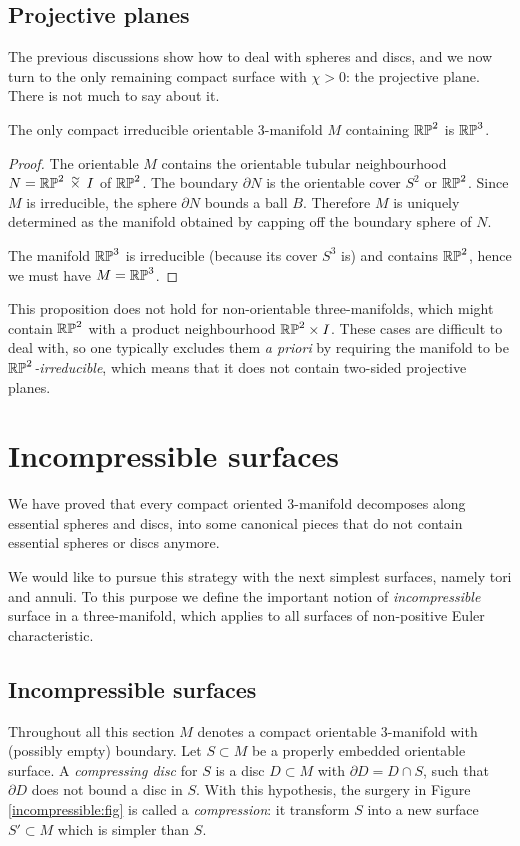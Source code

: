 \subsection{Projective planes}
The previous discussions show how to deal with spheres and discs, and we now turn to the only remaining compact surface with $\chi>0$: the projective plane. There is not much to say about it.

\begin{prop}
The only compact irreducible orientable 3-manifold $M$ containing $\mathbb{RP}^2$ is $\mathbb{RP}^3$.
\end{prop}
\begin{proof}
The orientable $M$ contains the orientable tubular neighbourhood $N=\matRP^2 \timtil I$ of $\mathbb{RP}^2$. The boundary $\partial N$ is the orientable cover $S^2$ or $\mathbb{RP}^2$. Since $M$ is irreducible, the sphere $\partial N$ bounds a ball $B$. Therefore $M$ is uniquely determined as the manifold obtained by capping off the boundary sphere of $N$. 

The manifold $\mathbb{RP}^3$ is irreducible (because its cover $S^3$ is) and contains $\mathbb{RP}^2$, hence we must have $M=\mathbb{RP}^3$.
\end{proof}

This proposition does not hold for non-orientable three-manifolds, which might contain $\mathbb{RP}^2$ with a product neighbourhood $\mathbb{RP}^2\times I$. These 
cases are difficult to deal with, so one typically excludes them \emph{a priori} by requiring the manifold to be \emph{$\mathbb{RP}^2$-irreducible}, which means that it does not contain two-sided projective planes.

\section{Incompressible surfaces}
We have proved that every compact oriented 3-manifold decomposes along essential spheres and discs, into some canonical pieces that do not contain essential spheres or discs anymore. 

We would like to pursue this strategy with the next simplest surfaces, namely tori and annuli. To this purpose we define the important notion of \emph{incompressible} surface in a three-manifold, which applies to all surfaces of non-positive Euler characteristic.

\subsection{Incompressible surfaces}
Throughout all this section $M$ denotes a compact orientable 3-manifold with (possibly empty) boundary. Let $S\subset M$ be a properly embedded orientable surface. A \emph{compressing disc} for $S$ is a disc $D\subset M$ with $\partial D = D \cap S$, such that $\partial D$ does not bound a disc in $S$. With this hypothesis, the surgery in Figure \ref{incompressible:fig} is called a \emph{compression}: it transform $S$ into a new surface $S'\subset M$ which is simpler than $S$.

